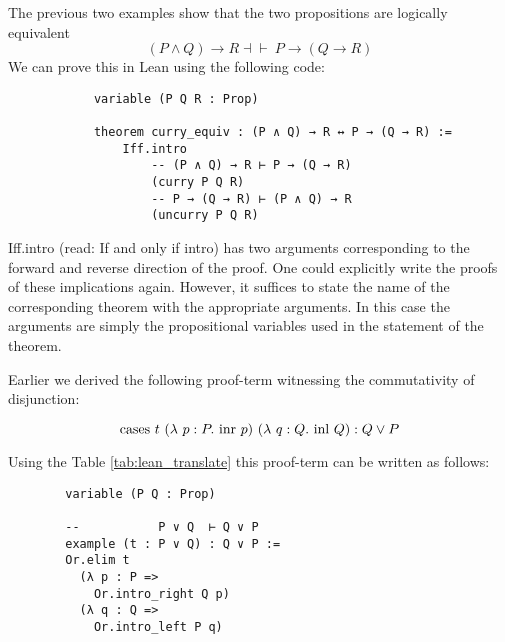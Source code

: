 \documentclass{book}
\begin{document}
    The previous two examples show that the two propositions are logically equivalent $$(P \land Q) \to R \dashv \vdash \ P \to (Q \to R)$$ We can prove this in Lean using the following code: 
    \begin{eg} 
        \begin{lstlisting}
            variable (P Q R : Prop)

            theorem curry_equiv : (P ∧ Q) → R ↔ P → (Q → R) :=
                Iff.intro
                    -- (P ∧ Q) → R ⊢ P → (Q → R)
                    (curry P Q R)
                    -- P → (Q → R) ⊢ (P ∧ Q) → R
                    (uncurry P Q R)
        \end{lstlisting}
        Iff.intro (read: If and only if intro) has two arguments corresponding to the forward and reverse direction of the proof. One could explicitly write the proofs of these implications again. However, it suffices to state the name of the corresponding theorem with the appropriate arguments. In this case the arguments are simply the propositional variables used in the statement of the theorem. 
    \end{eg}

    \newpage
    \begin{eg}

        Earlier we derived the following proof-term witnessing the commutativity of disjunction:

        $$ \text{cases} \ t \ (\lambda \ p : P. \ \text{inr} \ p) \ (\lambda \ q : Q. \ \text{inl} \ Q) : Q \lor P $$

        Using the Table \ref{tab:lean_translate} this proof-term can be written as follows:

        \begin{lstlisting}
        variable (P Q : Prop)

        --           P ∨ Q  ⊢ Q ∨ P
        example (t : P ∨ Q) : Q ∨ P :=
        Or.elim t
          (λ p : P =>
            Or.intro_right Q p)
          (λ q : Q =>
            Or.intro_left P q)  
        \end{lstlisting}
    \end{eg}
\end{document}
